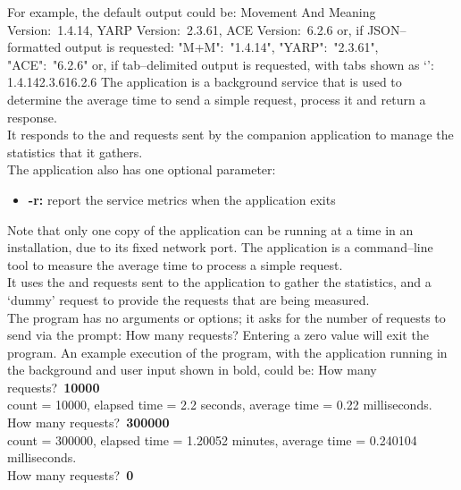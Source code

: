 For example, the default output could be:
\outputBegin{}
Movement And Meaning Version:\ 1.4.14, YARP Version:\ 2.3.61, ACE Version:\ 6.2.6
\outputEnd{}
or, if JSON--formatted output is requested:
\outputBegin{}
\textbraceleft{} "M+M":\ "1.4.14", "YARP":\ "2.3.61", "ACE":\ "6.2.6" \textbraceright
\outputEnd{}
or, if tab--delimited output is requested, with tabs shown as
`\texttt{\boldmath{$\vdash$}}':
\outputBegin{}
1.4.14\pseudotab{}2.3.61\pseudotab{}6.2.6
\outputEnd{}
\secondaryEnd{}
\newpage
{}
The  application is a background service that is
used to determine the average time to send a simple request, process it and return a
response.\\

It responds to the  and
 requests sent by the
companion application  to manage the statistics
that it gathers.\\

The application also has one optional parameter:
\begin{itemize}
\item \textbf{-r:} report the service metrics when the application exits
\end{itemize}
Note that only one copy of the  application can be
running at a time in an \mplusm{} installation, due to its fixed \yarp{} network port.
The  application is a command--line tool to
measure the average time to process a simple request.\\

It uses the  and
 requests sent to the
 application to gather the statistics, and a
`dummy' request to provide the requests that are being measured.\\

The program has no arguments or options; it asks for the number of requests to send via
the prompt:
\outputBegin{}
How many requests?
\outputEnd{}
Entering a zero value will exit the program.
An example execution of the program, with the 
application running in the background and user input shown in bold, could be:
\outputBegin{}
How many requests?\ \textbf{10000}\\
count = 10000, elapsed time = 2.2 seconds, average time = 0.22 milliseconds.\\
How many requests?\ \textbf{300000}\\
count = 300000, elapsed time = 1.20052 minutes, average time = 0.240104 milliseconds.\\
How many requests?\ \textbf{0}
\outputEnd{}
\secondaryEnd{}
\primaryEnd{}
